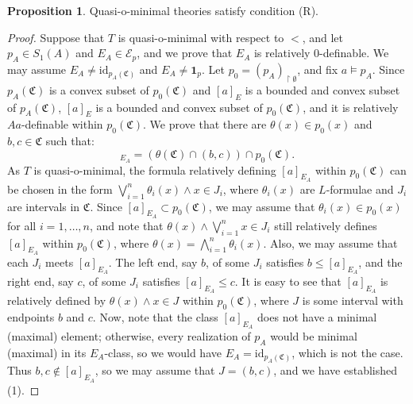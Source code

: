 \documentclass{amsart}
\theoremstyle{definition}
\newtheorem{Proposition}[Theorem]{Proposition}
\theoremstyle{definition}
\def\strok{\restriction}
\newcommand{\Mon}{\mathfrak C}
\begin{document}
\begin{Proposition}\label{Prop_quasio_satisfy_R} 
Quasi-o-minimal theories satisfy condition (R).
\end{Proposition}
\begin{proof}
Suppose that $T$ is quasi-o-minimal with respect to $<$, and let $p_A\in S_1(A)$ and $E_A\in\mathcal E_p$, and we prove that $E_A$ is relatively 0-definable. We may assume $E_A\neq\mathrm{id}_{p_A(\Mon)}$ and $E_A\neq \mathbf 1_p$. 
Let $p_0=(p_A)_{\strok\emptyset}$, and fix $a\models p_A$.
Since $p_A(\Mon)$ is a convex subset of $p_0(\Mon)$ and $[a]_E$ is a bounded and convex subset of $p_A(\Mon)$, $[a]_E$ is a bounded and convex subset of $p_0(\Mon)$, and it is relatively $Aa$-definable within $p_0(\Mon)$. We prove that there are $\theta(x)\in p_0(x)$ and $b,c\in\Mon$ such that:
\setcounter{equation}{0}
\begin{equation}
[a]_{E_A}=(\theta(\Mon)\cap (b,c))\cap p_0(\Mon).
\end{equation}
As $T$ is quasi-o-minimal, the formula relatively defining $[a]_{E_A}$ within $p_0(\Mon)$ can be chosen in the form $\bigvee_{i=1}^n\theta_i(x)\land x\in J_i$, where $\theta_i(x)$ are $L$-formulae and $J_i$ are intervals in $\Mon$. Since $[a]_{E_A}\subset p_0(\Mon)$, we may assume that $\theta_i(x)\in p_0(x)$ for all $i=1,\dots,n$, and note that $\theta(x)\land\bigvee_{i=1}^nx\in J_i$ still relatively defines $[a]_{E_A}$ within $p_0(\Mon)$, where $\theta(x)=\bigwedge_{i=1}^n\theta_i(x)$. Also, we may assume that each $J_i$ meets $[a]_{E_A}$. The left end, say $b$, of some $J_i$ satisfies $b\leqslant[a]_{E_A}$, and the right end, say $c$, of some $J_i$ satisfies $[a]_{E_A}\leqslant c$. It is easy to see that $[a]_{E_A}$ is relatively defined by $\theta(x)\land x\in J$ within $p_0(\Mon)$, where $J$ is some interval with endpoints $b$ and $c$. 
Now, note that the class $[a]_{E_A}$ does not have a minimal (maximal) element; otherwise, every realization of $p_A$ would be minimal (maximal) in its $E_A$-class, so we would have $E_A=\mathrm{id}_{p_A(\Mon)}$, which is not the case. Thus $b,c\notin[a]_{E_A}$, so we may assume that $J=(b,c)$, and we have established (1). 


\end{proof}
\end{document}
